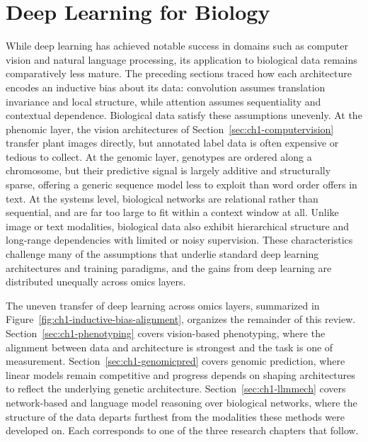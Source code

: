 \section{Deep Learning for Biology}\label{sec:ch1-biology}
While deep learning has achieved notable success in domains such as computer vision and natural language processing, its application to biological data remains comparatively less mature. The preceding sections traced how each architecture encodes an inductive bias about its data: convolution assumes translation invariance and local structure, while attention assumes sequentiality and contextual dependence. Biological data satisfy these assumptions unevenly. At the phenomic layer, the vision architectures of Section~\ref{sec:ch1-computervision} transfer plant images directly, but annotated label data is often expensive or tedious to collect. At the genomic layer, genotypes are ordered along a chromosome, but their predictive signal is largely additive and structurally sparse, offering a generic sequence model less to exploit than word order offers in text. At the systems level, biological networks are relational rather than sequential, and are far too large to fit within a context window at all. Unlike image or text modalities, biological data also exhibit hierarchical structure and long-range dependencies with limited or noisy supervision. These characteristics challenge many of the assumptions that underlie standard deep learning architectures and training paradigms, and the gains from deep learning are distributed unequally across omics layers.

The uneven transfer of deep learning across omics layers, summarized in Figure~\ref{fig:ch1-inductive-bias-alignment}, organizes the remainder of this review. Section~\ref{sec:ch1-phenotyping} covers vision-based phenotyping, where the alignment between data and architecture is strongest and the task is one of measurement. Section~\ref{sec:ch1-genomicpred} covers genomic prediction, where linear models remain competitive and progress depends on shaping architectures to reflect the underlying genetic architecture. Section~\ref{sec:ch1-llmmech} covers network-based and language model reasoning over biological networks, where the structure of the data departs furthest from the modalities these methods were developed on. Each corresponds to one of the three research chapters that follow.

